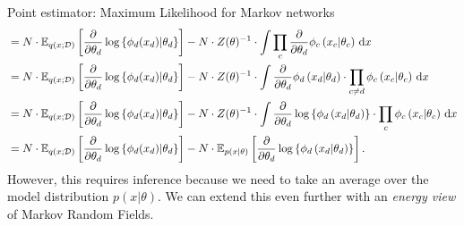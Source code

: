 \begin{topic}{.3cm}{Point estimator: Maximum Likelihood for Markov networks}
\begin{equation}
\begin{aligned}
	&= N\cdot \E[q(x;\mathcal{D})]{\frac{\partial}{\partial\theta_d} \log\left\{ \phi_d(x_d) \middle| \theta_d \right\}} %
		- N\cdot Z(\theta)^{-1} \cdot \int \prod_c \frac{\partial}{\partial\theta_d} \phi_c\left(x_c \middle| \theta_c \right) \,\mathrm{d}x \\
	&= N\cdot \E[q(x;\mathcal{D})]{\frac{\partial}{\partial\theta_d} \log\left\{ \phi_d(x_d) \middle| \theta_d \right\}} %
		- N\cdot Z(\theta)^{-1} \cdot \int \frac{\partial}{\partial\theta_d} \phi_d\left(x_d \middle| \theta_d \right) \cdot \prod_{c\neq d} \phi_c\left(x_c \middle| \theta_c \right) \,\mathrm{d}x \\
	&= N\cdot \E[q(x;\mathcal{D})]{\frac{\partial}{\partial\theta_d} \log\left\{ \phi_d(x_d) \middle| \theta_d \right\}} %
		- N\cdot Z(\theta)^{-1} \cdot \int \frac{\partial}{\partial\theta_d} \log\left\{\phi_d\left(x_d \middle| \theta_d \right)\right\} \cdot \prod_{c} \phi_c\left(x_c \middle| \theta_c \right) \,\mathrm{d}x \\
	&= N\cdot \E[q(x;\mathcal{D})]{\frac{\partial}{\partial\theta_d} \log\left\{ \phi_d(x_d) \middle| \theta_d \right\}} %
		- N\cdot \E[p(x|\theta)]{ \frac{\partial}{\partial\theta_d} \log\left\{\phi_d\left(x_d \middle| \theta_d \right)\right\} }.
	\end{aligned}
	\end{equation}%
	However, this requires inference because we need to take an average over the model distribution \ensuremath{p(x|\theta)}. %
	We can extend this even further with an \emph{energy view} of Markov Random Fields. %
\end{topic}
%
\newpage
